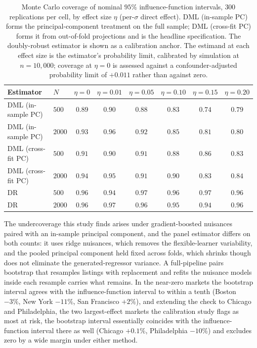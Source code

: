 \documentclass{article}
\begin{document}
\begin{table}[H]
\centering
\caption{Monte Carlo coverage of nominal $95\%$ influence-function intervals, $300$ replications per cell, by effect size $\eta$ (per-$\sigma$ direct effect). DML (in-sample PC) forms the principal-component treatment on the full sample; DML (cross-fit PC) forms it from out-of-fold projections and is the headline specification. The doubly-robust estimator is shown as a calibration anchor. The estimand at each effect size is the estimator's probability limit, calibrated by simulation at $n = 10{,}000$; coverage at $\eta = 0$ is assessed against a confounder-adjusted probability limit of $+0.011$ rather than against zero.}
\label{tab:sim_coverage}
\begin{tabular}{llcccccc}
\toprule
Estimator & $N$ & $\eta=0$ & $\eta=0.01$ & $\eta=0.05$ & $\eta=0.10$ & $\eta=0.15$ & $\eta=0.20$ \\
\midrule
DML (in-sample PC) & $500$ & $0.89$ & $0.90$ & $0.88$ & $0.83$ & $0.74$ & $0.79$ \\
DML (in-sample PC) & $2000$ & $0.93$ & $0.96$ & $0.92$ & $0.85$ & $0.81$ & $0.80$ \\
DML (cross-fit PC) & $500$ & $0.91$ & $0.90$ & $0.91$ & $0.88$ & $0.86$ & $0.83$ \\
DML (cross-fit PC) & $2000$ & $0.94$ & $0.95$ & $0.91$ & $0.90$ & $0.83$ & $0.84$ \\
DR & $500$ & $0.96$ & $0.94$ & $0.97$ & $0.96$ & $0.97$ & $0.96$ \\
DR & $2000$ & $0.96$ & $0.97$ & $0.96$ & $0.95$ & $0.94$ & $0.96$ \\
\bottomrule
\end{tabular}
\end{table}




The undercoverage this study finds arises under gradient-boosted nuisances paired with an in-sample principal component, and the panel estimator differs on both counts: it uses ridge nuisances, which removes the flexible-learner variability, and the pooled principal component held fixed across folds, which shrinks though does not eliminate the generated-regressor variance. A full-pipeline pairs bootstrap that resamples listings with replacement and refits the nuisance models inside each resample carries what remains. In the near-zero markets the bootstrap interval agrees with the influence-function interval to within a tenth (Boston $-3\%$, New York $-11\%$, San Francisco $+2\%$), and extending the check to Chicago and Philadelphia, the two largest-effect markets the calibration study flags as most at risk, the bootstrap interval essentially coincides with the influence-function interval there as well (Chicago $+0.1\%$, Philadelphia $-10\%$) and excludes zero by a wide margin under either method.
\end{document}
